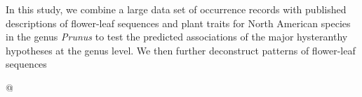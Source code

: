 \documentclass{article}\usepackage[]{graphicx}\usepackage[]{color}
\begin{document}
\noindent In this study, we combine a large data set of occurrence records with published descriptions of flower-leaf sequences and plant traits for North American species in the genus \textit{Prunus} to test the predicted associations of the major hysteranthy hypotheses at the genus level. We then further deconstruct patterns of flower-leaf sequences %






@







\end{document}
